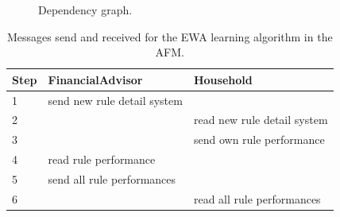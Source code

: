 \documentclass[a4paper,11pt]{article}
\begin{document}
\pagestyle{empty}
\begin{figure}[t!]
\centering\leavevmode
{}
\caption{Dependency graph.}
\label{Figure: graph}
\end{figure}
\clearpage


\begin{table}
  \centering
  \begin{tabular}{|l|l|l|}
  \hline
  Step & FinancialAdvisor & Household \\
  \hline\hline
    1 & send new rule detail system &   \\  \hline
    2 &                             & read new rule detail system \\  \hline
    3 &                             & send own rule performance \\  \hline
    4 & read rule performance       &  \\  \hline
    5 & send all rule performances  &  \\  \hline
    6 &                             & read all rule performances \\
  \hline
  \end{tabular}
  \caption{Messages send and received for the EWA learning algorithm in the AFM.}
  \label{Table: messages}
\end{table}
\end{document}
